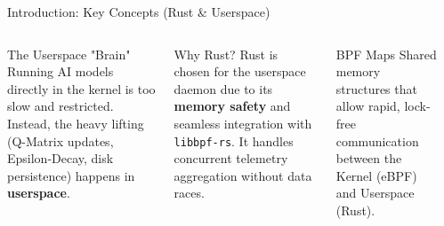 \documentclass[aspectratio=169]{beamer}
\begin{document}
\begin{frame}{Introduction: Key Concepts (Rust \& Userspace)}
  \begin{columns}[T, onlytextwidth]
    
    \begin{block}{The Userspace "Brain"}
    \small
    Running AI models directly in the kernel is too slow and restricted. Instead, the heavy lifting (Q-Matrix updates, Epsilon-Decay, disk persistence) happens in \textbf{userspace}.
    \end{block}
    
    \vspace{2pt}
    
    \begin{block}{Why Rust?}
    \small
    Rust is chosen for the userspace daemon due to its \textbf{memory safety} and seamless integration with \texttt{libbpf-rs}. It handles concurrent telemetry aggregation without data races.
    \end{block}
    
    \vspace{2pt}
    
    \begin{block}{BPF Maps}
    \small
    Shared memory structures that allow rapid, lock-free communication between the Kernel (eBPF) and Userspace (Rust).
    \end{block}

      \vspace*{0.2cm}
      \begin{center}
      \end{center}
  \end{columns}
\end{frame}
\end{document}
